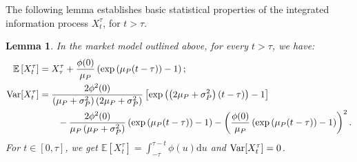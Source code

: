 \documentclass[12pt,centertags,reqno]{amsart}
\numberwithin{equation}{section} \makeatletter
\newtheorem{lemma}[theorem]{Lemma}
\newcommand{\ud}{\mathrm d}
\newcommand{\esp}[2][\mathbb E] {#1\left[#2\right]}
\begin{document}
The following lemma establishes basic statistical properties of the integrated information process $X_t^\tau$, for $t>\tau$. %
\begin{lemma}\label{th:means}
In the market model outlined above, for every $t > \tau$, %
we have:
\begin{align*}
\esp{X_t^\tau} & = %
X_\tau^\tau +\frac{\phi(0)}{\mu_{P}}\left(\exp\left(\mu_{P}(t-\tau)\right) -1\right);\\
{\rm Var}[X_t^\tau] & = %
\frac{2\phi^{2}(0)}{\left(\mu_{P}+\sigma_{P}^{2}\right)\left(2\mu_{P}+\sigma_{P}^{2}\right)}\left[\exp\left(\left(2\mu_{P}+\sigma_{P}^{2}\right)(t-\tau)\right) -1\right]\\
& \qquad -\frac{2\phi^{2}(0)}{\mu_{P}\left(\mu_{P}+\sigma_{P}^{2}\right)}\left(\exp\left(\mu_{P}(t-\tau)\right) -1\right)-\left(\frac{\phi(0)}{\mu_{P}}\left(\exp\left(\mu_{P}(t-\tau)\right) -1\right)\right)^2.
\end{align*}
For $t\in [0,\tau]$, we get $\esp{X_t^\tau}=\int_{-\tau}^{\tau-t} \phi(u) \ud u$ and ${\rm Var}[X_t^\tau]=0$.
\end{lemma}
\end{document}
